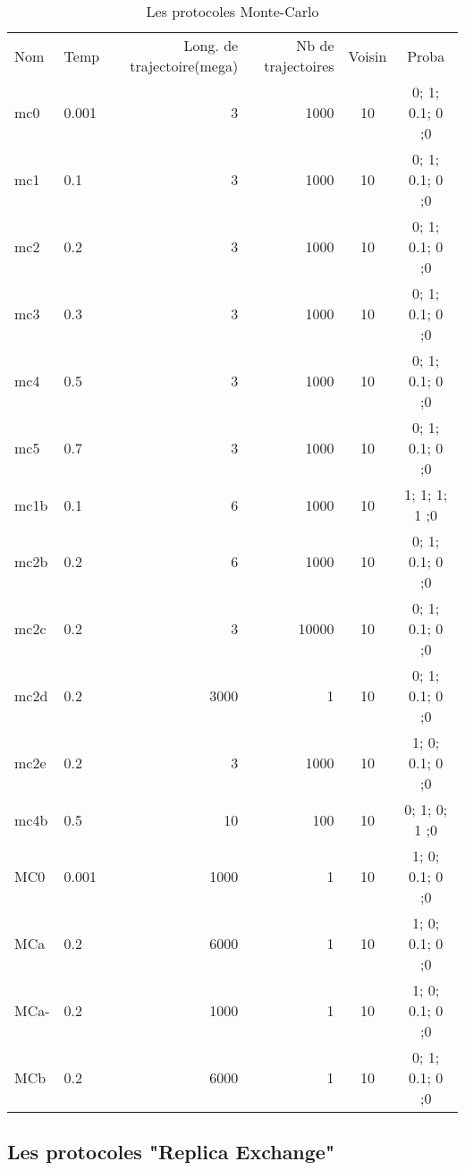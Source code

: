     \begin{table}[!htbp]
      \centering

      \begin{tabular}{llrrcc}

        \toprule
        Nom & Temp & Long. de trajectoire(mega) & Nb de trajectoires  & Voisin & Proba \\
        \cmidrule{1-6}
        mc0   & 0.001 &  3  &  1000  & 10 & 0; 1; 0.1; 0 ;0 \\      
        mc1   & 0.1   &  3  &  1000  & 10 & 0; 1; 0.1; 0 ;0 \\  
        mc2   & 0.2   &  3  &  1000  & 10 & 0; 1; 0.1; 0 ;0 \\ 
        mc3   & 0.3   &  3  &  1000  & 10 & 0; 1; 0.1; 0 ;0 \\               
        mc4   & 0.5   &  3  &  1000  & 10 & 0; 1; 0.1; 0 ;0 \\  
        mc5   & 0.7   &  3  &  1000  & 10 & 0; 1; 0.1; 0 ;0 \\  
        mc1b  & 0.1   &  6  &  1000  & 10 & 1; 1;   1; 1 ;0 \\  
        mc2b  & 0.2   &  6  &  1000  & 10 & 0; 1; 0.1; 0 ;0 \\      
        mc2c  & 0.2   &  3  & 10000  & 10 & 0; 1; 0.1; 0 ;0 \\   
        mc2d  & 0.2   &  3000  &  1 & 10  & 0; 1; 0.1; 0 ;0 \\ 
        mc2e  & 0.2   &  3  &  1000  & 10 & 1; 0; 0.1; 0 ;0 \\     
        mc4b  & 0.5   & 10  &   100  & 10 & 0; 1;   0; 1 ;0 \\
        \cmidrule{1-6}
        MC0   & 0.001 &  1000  &  1  & 10 & 1; 0; 0.1; 0 ;0 \\            
        MCa   & 0.2   &  6000  &  1  & 10 & 1; 0; 0.1; 0 ;0 \\   
        MCa-  & 0.2   &  1000  &  1  & 10 & 1; 0; 0.1; 0 ;0 \\   
        MCb   & 0.2   &  6000  &  1  & 10 & 0; 1; 0.1; 0 ;0 \\      


        \bottomrule   

        
      \end{tabular}      
      \caption{Les protocoles Monte-Carlo}
\label{tab:protoMC}      
    \end{table}

   \subsection{Les protocoles "Replica Exchange"} 

